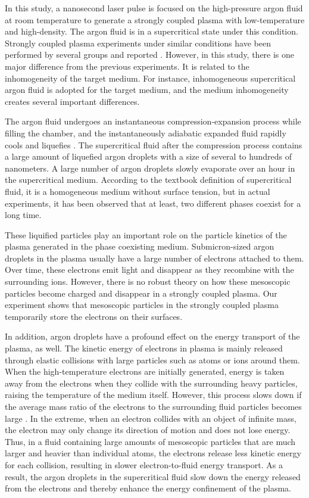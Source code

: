 In this study, a nanosecond laser pulse is focused on the high-pressure argon fluid at room temperature to generate a strongly coupled plasma with low-temperature and high-density. The argon fluid is in a supercritical state under this condition. Strongly coupled plasma experiments under similar conditions have been performed by several groups and reported \cite{tsuda2000calculation, harilal2004spatial, bataller2014blackbody, bataller2016observation}. However, in this study, there is one major difference from the previous experiments. It is related to the inhomogeneity of the target medium. For instance, inhomogeneous supercritical argon fluid is adopted for the target medium, and the medium inhomogeneity creates several important differences.

The argon fluid undergoes an instantaneous compression-expansion process while filling the chamber, and the instantaneously adiabatic expanded fluid rapidly cools and liquefies \cite{lee2021quasi}. The supercritical fluid after the compression process contains a large amount of liquefied argon droplets with a size of several to hundreds of nanometers. A large number of argon droplets slowly evaporate over an hour in the supercritical medium. According to the textbook definition of supercritical fluid, it is a homogeneous medium without surface tension, but in actual experiments, it has been observed that at least, two different phases coexist for a long time.

These liquified particles play an important role on the particle kinetics of the plasma generated in the phase coexisting medium. Submicron-sized argon droplets in the plasma usually have a large number of electrons attached to them. Over time, these electrons emit light and disappear as they recombine with the surrounding ions. However, there is no robust theory on how these mesoscopic particles become charged and disappear in a strongly coupled plasma. Our experiment shows that mesoscopic particles in the strongly coupled plasma temporarily store the electrons on their surfaces.

In addition, argon droplets have a profound effect on the energy transport of the plasma, as well. The kinetic energy of electrons in plasma is mainly released through elastic collisions with large particles such as atoms or ions around them. When the high-temperature electrons are initially generated, energy is taken away from the electrons when they collide with the surrounding heavy particles, raising the temperature of the medium itself. However, this process slows down if the average mass ratio of the electrons to the surrounding fluid particles becomes large \cite{bellan2008fundamentals}. In the extreme, when an electron collides with an object of infinite mass, the electron may only change its direction of motion and does not lose energy. Thus, in a fluid containing large amounts of mesoscopic particles that are much larger and heavier than individual atoms, the electrons release less kinetic energy for each collision, resulting in slower electron-to-fluid energy transport. As a result, the argon droplets in the supercritical fluid slow down the energy released from the electrons and thereby enhance the energy confinement of the plasma.

